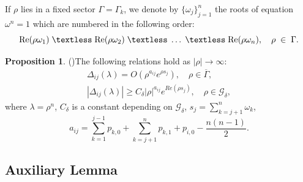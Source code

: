 \documentclass[reqno,12pt,centertags]{amsart}
\renewcommand{\Re}{\text{\rm Re}}
\numberwithin{equation}{section}
\theoremstyle{definition}
\newtheorem{proposition}[theorem]{Proposition}
\begin{document}
If $\rho$ lies in a fixed sector $\Gamma=\Gamma_{k}$, we denote by $\{\omega_{j}\}_{j=1}^{n}$ the roots of equation $\omega^{n}=1$ which are numbered in the following order: 
\begin{equation*}
	\Re(\rho \omega_{1})\;\textless\;\Re(\rho \omega_{2})\;\textless\;\dots\;\textless\;\Re(\rho \omega_{n}), \quad \rho\;\in\;\Gamma.
\end{equation*}


\begin{proposition}(\cite{Bon6})\label{prof4}
	The following relations hold as 
	$|\rho|\rightarrow\infty:$
	\begin{equation*}
		\begin{array}{ll}
			\Delta_{ij}(\lambda)=O(\rho^{a_{ij}}e^{\rho s_{j}}),\quad \rho\in\overline{\Gamma},\\
			|\Delta_{ij}(\lambda)|\geq C_{\delta}|\rho|^{a_{ij}}e^{Re(\rho s_{j})},\quad\rho\in\mathcal{G}_{\delta},
		\end{array}
	\end{equation*}
	where $\lambda=\rho^n$, $C_{\delta}$ is a constant depending on $\mathcal{G}_{\delta}$,  $s_{j}=\sum\limits_{k=j+1}^{n}\omega_{k}$,
	$$a_{ij}=\sum_{k=1}^{j-1}p_{k,0}+\sum_{k=j+1}^{n}p_{k,1}+p_{i,0}-\frac{n(n-1)}{2}.$$
\end{proposition}


\subsection{Auxiliary Lemma}
\end{document}
